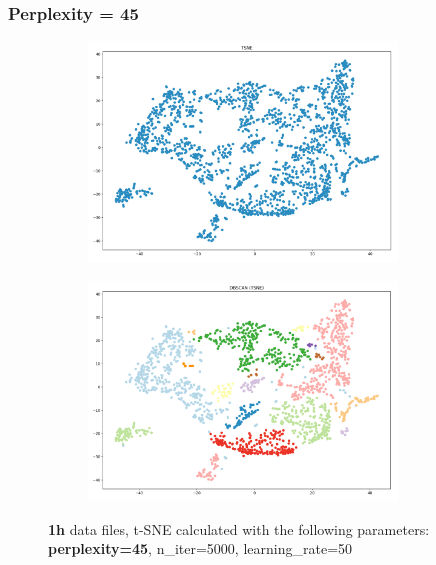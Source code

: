 \subsubsection{Perplexity = 45}
\begin{figure}[H]
  \centering
  \begin{subfigure}{.5\textwidth}
    \centering
    \includegraphics[width=0.9\textwidth]{./images/tsneParametersTest/perplexity/perp45-1hTSNE.png}
  \end{subfigure}%
  \begin{subfigure}{.5\textwidth}
    \centering
    \includegraphics[width=0.9\textwidth]{./images/tsneParametersTest/perplexity/perp45-1hDBSCAN.png}
  \end{subfigure}
	\caption{\textbf{1h} data files, t-SNE calculated with the following parameters: \textbf{perplexity=45}, n\_iter=5000, learning\_rate=50}
  \label{figure:1hperp45TSNE}
\end{figure}

